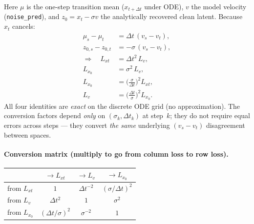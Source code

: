 \documentclass[11pt,a4paper]{article}
\newcommand{\dt}{\Delta t}
\begin{document}
Here $\mu$ is the one-step transition mean ($x_{t+\dt}$ under ODE), $v$ the model velocity
(\texttt{noise\_pred}), and $z_0=x_t-\sigma v$ the analytically recovered clean latent. Because
$x_t$ cancels:
\begin{align}
\mu_s-\mu_t &= \dt\,(v_s-v_t),
\label{eq:mu-v}\\
z_{0,s}-z_{0,t} &= -\sigma\,(v_s-v_t),
\label{eq:x0-v}\\
\Rightarrow\quad
L_{xt} &= \dt^2\,L_v,
\label{eq:mu-v-sq}\\
L_{x_0} &= \sigma^2\,L_v,
\label{eq:x0-v-sq}\\
L_{x_0} &= \Big(\tfrac{\sigma}{\dt}\Big)^2 L_{xt},
\label{eq:x0-mu}\\
L_v &= \Big(\tfrac{\dt}{\sigma}\Big)^2 L_{x_0}.
\label{eq:v-x0}
\end{align}
All four identities are \emph{exact} on the discrete ODE grid (no approximation). The conversion
factors depend \emph{only} on $(\sigma_k,\dt_k)$ at step~$k$; they do not require equal errors
across steps --- they convert \emph{the same} underlying $(v_s-v_t)$ disagreement between spaces.

\paragraph{Conversion matrix (multiply to go from column loss to row loss).}
\begin{center}
\footnotesize
\renewcommand{\arraystretch}{1.3}
\begin{tabular}{@{}l|ccc@{}}
 & $\to L_{xt}$ & $\to L_v$ & $\to L_{x_0}$ \\
\midrule
from $L_{xt}$ & $1$ & $\dt^{-2}$ & $(\sigma/\dt)^2$ \\
from $L_v$ & $\dt^2$ & $1$ & $\sigma^2$ \\
from $L_{x_0}$ & $(\dt/\sigma)^2$ & $\sigma^{-2}$ & $1$ \\
\end{tabular}
\end{center}
\end{document}
